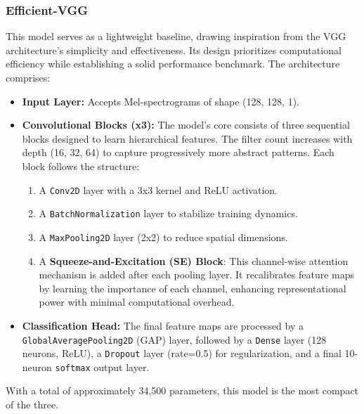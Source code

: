\documentclass[11pt,a4paper]{article}
\begin{document}
\subsubsection{Efficient-VGG}
This model serves as a lightweight baseline, drawing inspiration from the VGG architecture's simplicity and effectiveness. Its design prioritizes computational efficiency while establishing a solid performance benchmark. The architecture comprises:
\begin{itemize}
    \item \textbf{Input Layer:} Accepts Mel-spectrograms of shape (128, 128, 1).
    \item \textbf{Convolutional Blocks (x3):} The model's core consists of three sequential blocks designed to learn hierarchical features. The filter count increases with depth (16, 32, 64) to capture progressively more abstract patterns. Each block follows the structure:
    \begin{enumerate}
        \item A \texttt{Conv2D} layer with a 3x3 kernel and ReLU activation.
        \item A \texttt{BatchNormalization} layer to stabilize training dynamics.
        \item A \texttt{MaxPooling2D} layer (2x2) to reduce spatial dimensions.
        \item A \textbf{Squeeze-and-Excitation (SE) Block}: This channel-wise attention mechanism is added after each pooling layer. It recalibrates feature maps by learning the importance of each channel, enhancing representational power with minimal computational overhead.
    \end{enumerate}
    \item \textbf{Classification Head:} The final feature maps are processed by a \texttt{GlobalAveragePooling2D} (GAP) layer, followed by a \texttt{Dense} layer (128 neurons, ReLU), a \texttt{Dropout} layer (rate=0.5) for regularization, and a final 10-neuron \texttt{softmax} output layer.
\end{itemize}
With a total of approximately 34,500 parameters, this model is the most compact of the three.
\end{document}
